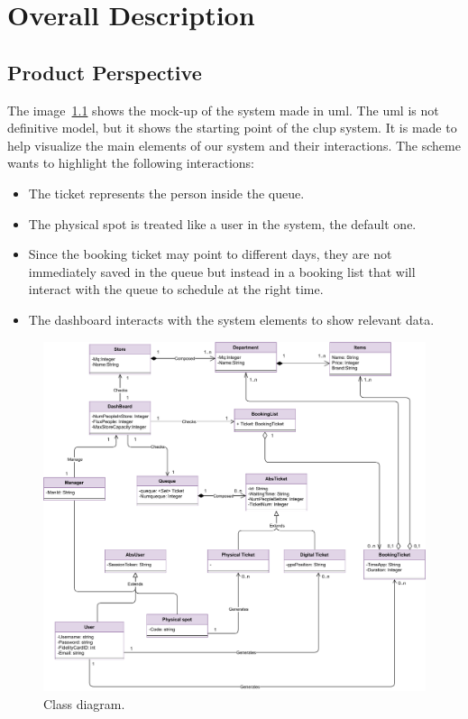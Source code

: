 \chapter{Overall Description}


\section{Product Perspective}
The image~\ref{figure:UML} shows the mock-up of the system made in \gls{uml}. The \gls{uml} is not definitive model, but it shows the starting point of the \gls{clup} system. It is made to help visualize the main elements of our system and their interactions. The scheme wants to highlight the following interactions:
\begin{itemize}

    \item The ticket represents the person inside the queue.

    \item The physical spot is treated like a user in the system, the default one.

    \item Since the booking ticket may point to different days, they are not immediately saved in the queue but instead in a booking list that will interact with the queue to schedule at the right time.

    \item The dashboard interacts with the system elements to show relevant data.
\end{itemize}

\begin{figure}[H]
    \centering
    \includegraphics[width=1.0\textwidth]{images/UML.pdf}
    \caption{Class diagram.}
    \label{figure:UML}
\end{figure}

